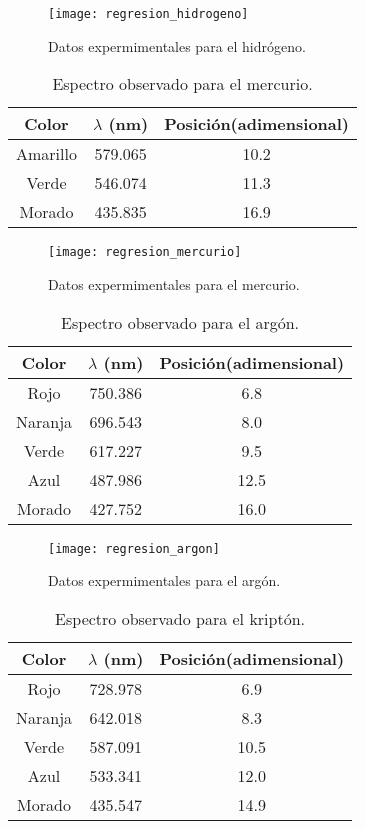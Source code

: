\documentclass[prb,aps,twocolumn,preprintnumbers,amsmath,amssymb]{revtex4}
\begin{document}
\begin{figure}[h!]
	\centering
	\texttt{[image: regresion\_hidrogeno]}
	\caption{Datos expermimentales para el hidrógeno.}
\end{figure}

\begin{table}[h!]
\caption{\label{Tabla 3}Espectro observado para el mercurio.}
\begin{ruledtabular}
\begin{tabular}{ccc}
Color&$\lambda$ (nm)&Posición(adimensional)\\
\hline
Amarillo & 579.065 & 10.2\\
Verde & 546.074 & 11.3\\
Morado & 435.835 & 16.9\\
\end{tabular}
\end{ruledtabular}
\end{table}

\begin{figure}[h!]
	\centering
	\texttt{[image: regresion\_mercurio]}
	\caption{Datos expermimentales para el mercurio.}
\end{figure}

\begin{table}[h!]
\caption{\label{Tabla 4}Espectro observado para el argón.}
\begin{ruledtabular}
\begin{tabular}{ccc}
Color&$\lambda$ (nm)&Posición(adimensional)\\
\hline
Rojo & 750.386 & 6.8\\
Naranja & 696.543 & 8.0\\
Verde & 617.227 & 9.5\\
Azul & 487.986 & 12.5\\
Morado & 427.752 & 16.0\\
\end{tabular}
\end{ruledtabular}
\end{table}

\begin{figure}[h!]
	\centering
	\texttt{[image: regresion\_argon]}
	\caption{Datos expermimentales para el argón.}
\end{figure}

\begin{table}[h!]
\caption{\label{Tabla 5}Espectro observado para el kriptón.}
\begin{ruledtabular}
\begin{tabular}{ccc}
Color&$\lambda$ (nm)&Posición(adimensional)\\
\hline
Rojo & 728.978 & 6.9\\
Naranja & 642.018 & 8.3\\
Verde & 587.091 & 10.5\\
Azul & 533.341 & 12.0\\
Morado & 435.547 & 14.9\\
\end{tabular}
\end{ruledtabular}
\end{table}
\end{document}
